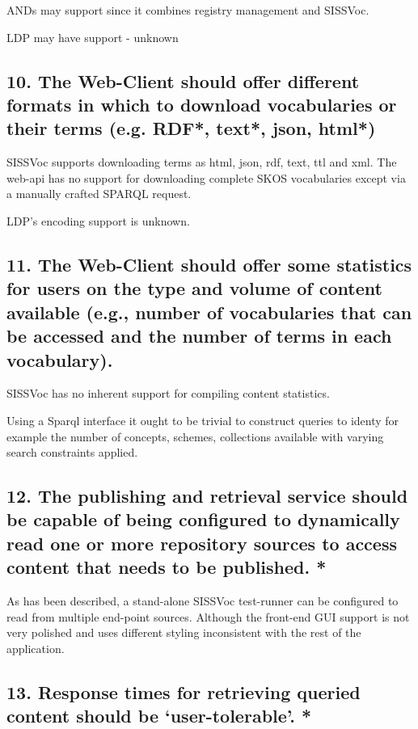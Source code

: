 \documentclass[10pt,a4paper]{article}
\begin{document}
\begin{flushleft}
\item [ANDs] may support since it combines registry management and SISSVoc. 

\item [LDP] may have support - unknown



\subsection{ 10. The Web-Client should offer different formats in which to
download vocabularies or their terms (e.g. RDF*, text*, json, html*) }

SISSVoc supports downloading terms as html, json, rdf, text, ttl and xml. The
web-api has no support for downloading complete SKOS vocabularies except via a
manually crafted SPARQL request.

LDP's encoding support is unknown.

\subsection{ 11. The Web-Client should offer some statistics for users on the
type and volume of content available (e.g., number of vocabularies that can be
accessed and the number of terms in each vocabulary).  }
 

SISSVoc has no inherent support for compiling content statistics.

Using a Sparql interface it ought to be trivial to construct queries to identy
for example the number of concepts, schemes, collections available with varying
search constraints applied. 

\subsection{ 12. The publishing and retrieval service should be capable of
being configured to dynamically read one or more repository sources to access
content that needs to be published. * }

As has been described, a stand-alone SISSVoc test-runner can be configured to
read from multiple end-point sources. Although the front-end GUI support is not
very polished and uses different styling inconsistent with the rest of the
application.


\subsection{ 
13. Response times for retrieving queried content should be ‘user-tolerable’. *
}


\end{flushleft}
\end{document}

